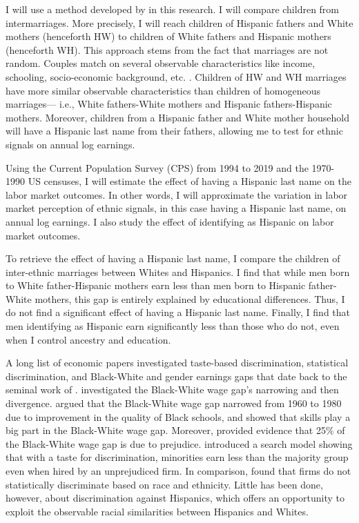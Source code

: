 \documentclass[12pt, fullpage]{article}
\begin{document}
I will use a method developed by \citet{rubinstein2014pride} in this research. I will compare children from intermarriages. More precisely, I will reach children of Hispanic fathers and White mothers (henceforth HW) to children of White fathers and Hispanic mothers (henceforth  WH). This approach stems from the fact that marriages are not random. Couples match on several observable characteristics like income, schooling, socio-economic background, etc. \citep{averettBetterWorseRelationship2008, averettEconomicRealityBeauty1996, beckerTheoryMarriagePart1973, beckerTheoryMarriagePart1974, beckerTreatiseFamily1993, browningCollectiveUnitaryModels2006, chiapporiFatterAttractionAnthropometric2012}. Children of HW and WH marriages have more similar observable characteristics than children of homogeneous marriages--- i.e., White fathers-White mothers and Hispanic fathers-Hispanic mothers. Moreover, children from a Hispanic father and White mother household will have a Hispanic last name from their fathers, allowing me to test for ethnic signals on annual log earnings.

Using the Current Population Survey (CPS) from 1994 to 2019 and the 1970-1990 US censuses, I will estimate the effect of having a Hispanic last name on the labor market outcomes. In other words, I will approximate the variation in labor market perception of ethnic signals, in this case having a Hispanic last name, on annual log earnings. I also study the effect of identifying as Hispanic on labor market outcomes. 

To retrieve the effect of having a Hispanic last name, I compare the children of inter-ethnic marriages between Whites and Hispanics. I find that while men born to White father-Hispanic mothers earn less than men born to Hispanic father-White mothers, this gap is entirely explained by educational differences. Thus, I do not find a significant effect of having a Hispanic last name. Finally, I find that men identifying as Hispanic earn significantly less than those who do not, even when I control ancestry and education. 

A long list of economic papers investigated taste-based discrimination, statistical discrimination, and Black-White and gender earnings gaps that date back to the seminal work of \citet{becker2010economics}. \citet{bayer2018divergent} investigated the Black-White wage gap's narrowing and then divergence. \citet{card1992school} argued that the Black-White wage gap narrowed from 1960 to 1980 due to improvement in the quality of Black schools, and \citet{juhn1991accounting} showed that skills play a big part in the Black-White wage gap. Moreover,  \citet{charles2008prejudice} provided evidence that 25\% of the Black-White wage gap is due to prejudice. \citet{black1995discrimination} introduced a search model showing that with a taste for discrimination, minorities earn less than the majority group even when hired by an unprejudiced firm. In comparison, \citet{altonji2001employer} found that firms do not statistically discriminate based on race and ethnicity. Little has been done, however, about discrimination against Hispanics, which offers an opportunity to exploit the observable racial similarities between Hispanics and Whites.
\end{document}
